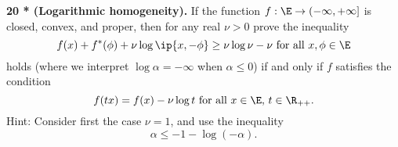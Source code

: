 \documentclass[../borwein-lewis_notes.tex]{subfiles}
\begin{document}
\noindent
\textbf{20 * (Logarithmic homogeneity).} If the function $f:\E\to(-\infty,
+\infty]$ is closed, convex, and proper, then for any real $\nu>0$ 
prove the inequality 
\begin{equation*}
f(x) + f^*(\phi) + \nu\log\ip{x,-\phi}\geq \nu\log\nu - \nu 
\text{ for all }x,\phi\in\E
\end{equation*}
holds (where we interpret $\log\alpha=-\infty$ when $\alpha\leq 0$) if 
and only if $f$ satisfies the condition 
\begin{equation*}
f(tx) = f(x)-\nu\log t \text{ for all }x\in\E,\,t\in\R_{++}.
\end{equation*}
Hint: Consider first the case $\nu=1$, and use the inequality 
\begin{equation*}
\alpha\leq -1-\log(-\alpha).
\end{equation*}
\end{document}
